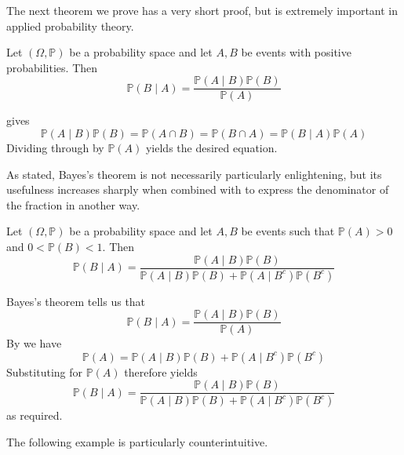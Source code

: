 The next theorem we prove has a very short proof, but is extremely important in applied probability theory.

\begin{theorem}
\label{thmBayes}
Let $(\Omega,\mathbb{P})$ be a probability space and let $A,B$ be events with positive probabilities. Then
\[ \mathbb{P}(B \mid A) = \frac{\mathbb{P}(A \mid B) \mathbb{P}(B)}{\mathbb{P}(A)} \]
\end{theorem}

\begin{cproof}
 gives
\[ \mathbb{P}(A \mid B)\mathbb{P}(B) = \mathbb{P}(A \cap B) = \mathbb{P}(B \cap A) = \mathbb{P}(B \mid A)\mathbb{P}(A) \]
Dividing through by $\mathbb{P}(A)$ yields the desired equation.
\end{cproof}

As stated, Bayes's theorem is not necessarily particularly enlightening, but its usefulness increases sharply when combined with  to express the denominator of the fraction in another way.

\begin{corollary}
\label{corBayes}
Let $(\Omega,\mathbb{P})$ be a probability space and let $A,B$ be events such that $\mathbb{P}(A)>0$ and $0<\mathbb{P}(B)<1$. Then
\[ \mathbb{P}(B \mid A) = \frac{\mathbb{P}(A \mid B)\mathbb{P}(B)}{\mathbb{P}(A \mid B)\mathbb{P}(B) + \mathbb{P}(A \mid B^c)\mathbb{P}(B^c)} \]
\end{corollary}

\begin{cproof}
Bayes's theorem tells us that
\[ \mathbb{P}(B \mid A) = \frac{\mathbb{P}(A \mid B) \mathbb{P}(B)}{\mathbb{P}(A)} \]
By  we have
\[ \mathbb{P}(A) = \mathbb{P}(A \mid B)\mathbb{P}(B) + \mathbb{P}(A \mid B^c)\mathbb{P}(B^c) \]
Substituting for $\mathbb{P}(A)$ therefore yields
\[ \mathbb{P}(B \mid A) = \frac{\mathbb{P}(A \mid B) \mathbb{P}(B)}{\mathbb{P}(A \mid B)\mathbb{P}(B) + \mathbb{P}(A \mid B^c)\mathbb{P}(B^c)} \]
as required.
\end{cproof}

The following example is particularly counterintuitive.

